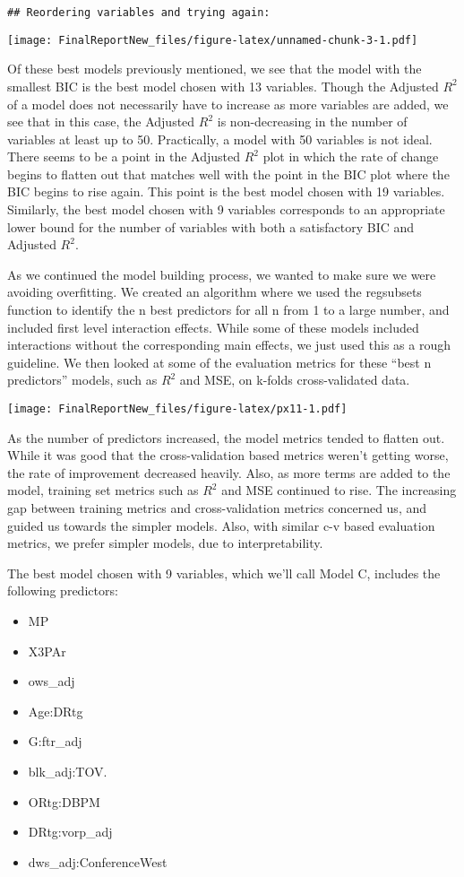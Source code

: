 \documentclass[]{article}
\providecommand{\tightlist}{%
  \setlength{\itemsep}{0pt}\setlength{\parskip}{0pt}}
\begin{document}
\begin{verbatim}
## Reordering variables and trying again:
\end{verbatim}

\texttt{[image: FinalReportNew\_files/figure-latex/unnamed-chunk-3-1.pdf]}

Of these best models previously mentioned, we see that the model with
the smallest BIC is the best model chosen with 13 variables. Though the
Adjusted \(R^2\) of a model does not necessarily have to increase as
more variables are added, we see that in this case, the Adjusted \(R^2\)
is non-decreasing in the number of variables at least up to 50.
Practically, a model with 50 variables is not ideal. There seems to be a
point in the Adjusted \(R^2\) plot in which the rate of change begins to
flatten out that matches well with the point in the BIC plot where the
BIC begins to rise again. This point is the best model chosen with 19
variables. Similarly, the best model chosen with 9 variables corresponds
to an appropriate lower bound for the number of variables with both a
satisfactory BIC and Adjusted \(R^2\).

As we continued the model building process, we wanted to make sure we
were avoiding overfitting. We created an algorithm where we used the
regsubsets function to identify the n best predictors for all n from 1
to a large number, and included first level interaction effects. While
some of these models included interactions without the corresponding
main effects, we just used this as a rough guideline. We then looked at
some of the evaluation metrics for these ``best n predictors'' models,
such as \(R^2\) and MSE, on k-folds cross-validated data.

\texttt{[image: FinalReportNew\_files/figure-latex/px11-1.pdf]}

As the number of predictors increased, the model metrics tended to
flatten out. While it was good that the cross-validation based metrics
weren't getting worse, the rate of improvement decreased heavily. Also,
as more terms are added to the model, training set metrics such as
\(R^2\) and MSE continued to rise. The increasing gap between training
metrics and cross-validation metrics concerned us, and guided us towards
the simpler models. Also, with similar c-v based evaluation metrics, we
prefer simpler models, due to interpretability.

The best model chosen with 9 variables, which we'll call Model C,
includes the following predictors:

\begin{itemize}
\tightlist
\item
  MP
\item
  X3PAr
\item
  ows\_adj
\item
  Age:DRtg
\item
  G:ftr\_adj
\item
  blk\_adj:TOV.
\item
  ORtg:DBPM
\item
  DRtg:vorp\_adj
\item
  dws\_adj:ConferenceWest
\end{itemize}
\end{document}
